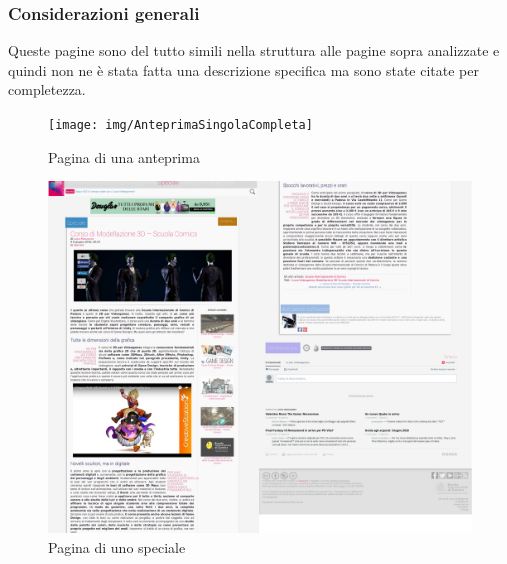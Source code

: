 \documentclass[../ProgettoTecWeb2.tex]{subfiles}
\begin{document}
		\subsubsection{Considerazioni generali}
		Queste pagine sono del tutto simili nella struttura alle pagine sopra analizzate e quindi non ne è stata fatta una descrizione specifica ma sono state citate per completezza.
	\begin{figure} [H]
		\centering
		\texttt{[image: img/AnteprimaSingolaCompleta]}
		\caption{Pagina di una anteprima}
	\end{figure}
	\begin{figure} [H]
		\centering
		\includegraphics[scale=0.18]{img/SpecialeSingolaCompleta}
		\caption{Pagina di uno speciale}
	\end{figure}
\end{document}
